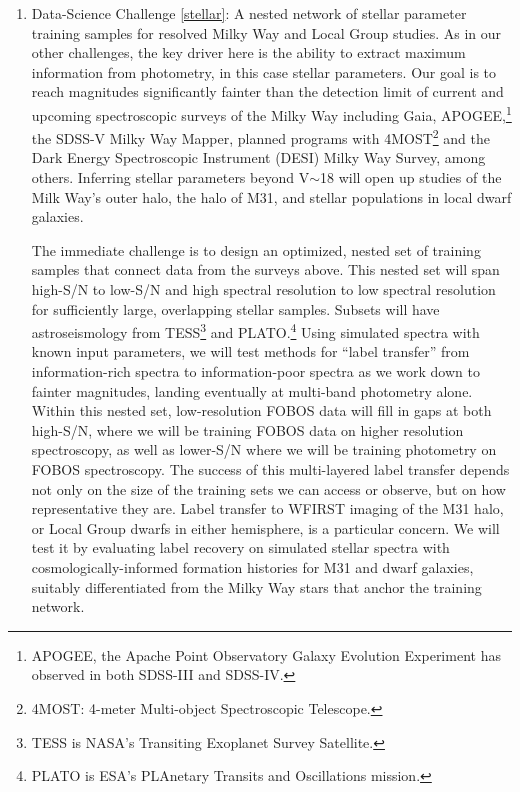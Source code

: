 \begin{enumerate}[rightmargin=0.2cm,leftmargin=0.2cm]

%
\item[] {\textsf {\large  Data-Science Challenge \ref{stellar}: A nested network of stellar parameter training
samples for resolved Milky Way and Local Group studies.}}  As in our other challenges, the key driver here is the
ability to extract maximum information from photometry, in this case stellar parameters.  Our goal is to reach
magnitudes significantly fainter than the detection limit of current and upcoming spectroscopic surveys of the Milky
Way including Gaia, APOGEE,\footnote{APOGEE, the Apache Point Observatory Galaxy Evolution Experiment has observed in
both SDSS-III and SDSS-IV.} the SDSS-V Milky Way Mapper, planned programs with 4MOST\footnote{4MOST: 4-meter
Multi-object Spectroscopic Telescope.} and the Dark Energy Spectroscopic Instrument (DESI) Milky Way Survey, among
others. Inferring
stellar parameters beyond V$\sim$18 will open up studies of the Milk Way's outer halo, the halo of M31, and stellar
populations in local dwarf galaxies.

The immediate challenge is to design an optimized, nested set of training samples that connect data from the surveys
above.  This nested set will span high-S/N to low-S/N and high spectral resolution to low spectral resolution for
sufficiently large, overlapping stellar samples.  Subsets will have astroseismology from TESS\footnote{TESS is NASA's
Transiting Exoplanet Survey Satellite.} and PLATO.\footnote{PLATO is ESA's PLAnetary Transits and Oscillations
mission.}  Using simulated spectra with known input parameters, we will test methods for ``label transfer'' from
information-rich spectra to information-poor spectra as we work down to fainter magnitudes, landing eventually at
multi-band photometry alone. Within this nested set, low-resolution FOBOS data will fill in gaps at both high-S/N,
where we will be training FOBOS data on higher resolution spectroscopy, as well as lower-S/N where we will be training
photometry on FOBOS spectroscopy.  The success of this multi-layered label transfer depends not only on the size of the
training sets we can access or observe, but on how representative they are.  Label transfer to WFIRST imaging of the
M31 halo, or Local Group dwarfs in either hemisphere, is a particular concern.  We will test it by evaluating label
recovery on simulated stellar spectra with cosmologically-informed formation histories for M31 and dwarf galaxies,
suitably differentiated from the Milky Way stars that anchor the training network.




\end{enumerate}
